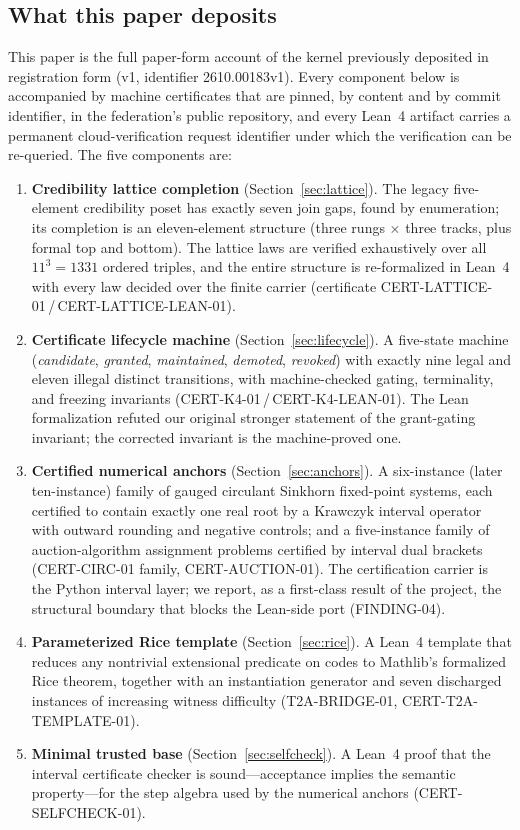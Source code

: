 \documentclass[11pt]{article}
\theoremstyle{definition}
\theoremstyle{remark}
\begin{document}
\subsection{What this paper deposits}

This paper is the full paper-form account of the kernel previously deposited
in registration form (v1, identifier 2610.00183v1). Every component below is
accompanied by machine certificates that are pinned, by content and by commit
identifier, in the federation's public repository, and every Lean~4 artifact
carries a permanent cloud-verification request identifier under which the
verification can be re-queried. The five components are:

\begin{enumerate}
\item \textbf{Credibility lattice completion} (Section~\ref{sec:lattice}).
The legacy five-element credibility poset has exactly seven join gaps, found
by enumeration; its completion is an eleven-element structure (three rungs
$\times$ three tracks, plus formal top and bottom). The lattice laws are
verified exhaustively over all $11^{3}=1331$ ordered triples, and the entire
structure is re-formalized in Lean~4 with every law decided over the finite
carrier (certificate CERT-LATTICE-01\,/\,CERT-LATTICE-LEAN-01).
\item \textbf{Certificate lifecycle machine} (Section~\ref{sec:lifecycle}).
A five-state machine (\emph{candidate}, \emph{granted}, \emph{maintained},
\emph{demoted}, \emph{revoked}) with exactly nine legal and eleven illegal
distinct transitions, with machine-checked gating, terminality, and freezing
invariants (CERT-K4-01\,/\,CERT-K4-LEAN-01). The Lean formalization refuted
our original stronger statement of the grant-gating invariant; the corrected
invariant is the machine-proved one.
\item \textbf{Certified numerical anchors} (Section~\ref{sec:anchors}). A
six-instance (later ten-instance) family of gauged circulant Sinkhorn
fixed-point systems, each certified to contain exactly one real root by a
Krawczyk interval operator with outward rounding and negative controls; and a
five-instance family of auction-algorithm assignment problems certified by
interval dual brackets (CERT-CIRC-01 family, CERT-AUCTION-01). The
certification carrier is the Python interval layer; we report, as a first-class
result of the project, the structural boundary that blocks the Lean-side port
(FINDING-04).
\item \textbf{Parameterized Rice template} (Section~\ref{sec:rice}). A
Lean~4 template that reduces any nontrivial extensional predicate on codes to
Mathlib's formalized Rice theorem, together with an instantiation generator
and seven discharged instances of increasing witness difficulty
(T2A-BRIDGE-01, CERT-T2A-TEMPLATE-01).
\item \textbf{Minimal trusted base} (Section~\ref{sec:selfcheck}). A Lean~4
proof that the interval certificate checker is sound---acceptance implies the
semantic property---for the step algebra used by the numerical anchors
(CERT-SELFCHECK-01).
\end{enumerate}
\end{document}
